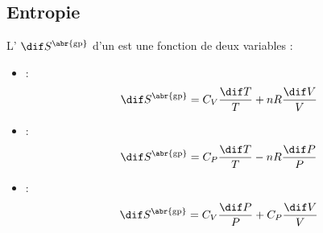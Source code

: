 \subsection{Entropie}

\begin{propriete}
L' $\dif S^{\text{\abr{gp}}}$ d'un  est une fonction de deux variables :

\begin{itemize}
\item {} :
\[\dif S^{\text{\abr{gp}}} = C_V \frac{\dif T}{T} + nR \frac{\dif V}{V}\]

\item {} :
\[\dif S^{\text{\abr{gp}}} = C_P \frac{\dif T}{T} - nR \frac{\dif P}{P}\]

\item {} :
\[\dif S^{\text{\abr{gp}}} = C_V \frac{\dif P}{P} + C_P \frac{\dif V}{V}\]
\end{itemize}
\end{propriete}
